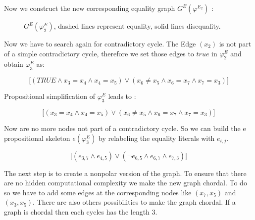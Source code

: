 \documentclass[11pt,a4paper]{uebung}
\begin{document}
Now we construct the new corresponding equality graph $G^{E} (\varphi^{E_2} )$ :

 \begin{figure}[h]
    \centering
    \caption{$G^E(\varphi^E_2)$, dashed lines represent equality, solid lines disequality.}
    \label{fig:sp2}
  \end{figure}

\bigskip

Now we have to search again for contradictory cycle.
The Edge $(x_2)$ is not part of a simple contradictory cycle, therefore we set those edges to $true$ in $\varphi^E_2$
and obtain $\varphi^E_3$ as:

\begin{displaymath}
   \big[ (TRUE \land x_3=x_4 \land x_4=x_5)
  \lor (x_6 \neq x_5 \land x_6=x_7 \land x_7=x_3)\big]
 \end{displaymath}
 

  Propositional simplification of $\varphi^E_3$ leads to :
 
 \begin{displaymath}
   \big[ ( x_3=x_4
  \land x_4=x_5)
  \lor (x_6 \neq x_5 \land x_6=x_7 \land x_7=x_3)\big]
 \end{displaymath}


Now are no more nodes not part of a contradictory cycle. So we can build the e propositional skeleton $ e(\varphi^E_3) $ by
  relabeling the equality literals with $e_{i,j}$.


\begin{displaymath}
   \big[ ( e_{3,7} \land e_{4,5} )
  \lor ( \neg e_{6,5} \land e_{6,7} \land e_{7,3})\big]
 \end{displaymath}

The next step is to create a nonpolar version of the graph. To ensure that there are no hidden computational complexity we make the new graph chordal. To do so we have to add some edges at the corresponding nodes like $(x_7,x_5)$ and $(x_3,x_5)$. There are also others possibilities to make the graph chordal. If a graph is chordal then each cycles has the length 3. 
\end{document}
